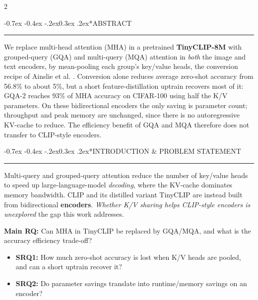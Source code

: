 \documentclass[a0,portrait]{a0poster}
\makeatletter
\renewcommand\section{\@startsection{section}{1}{\z@}%
  {-0.7ex \@plus -0.4ex \@minus -.2ex}{0.3ex \@plus .2ex}{\normalfont\large\bfseries}}
\makeatother
\begin{document}
\begin{multicols}{2}
\sloppy


\color{Black}
\section*{\Large{ABSTRACT}}
\vspace{-1cm}
\noindent\rule{\linewidth}{1pt}

We replace multi-head attention (MHA) in a pretrained \textbf{TinyCLIP-8M} with grouped-query (GQA) and multi-query (MQA) attention in \emph{both} the image and text encoders, by mean-pooling each group's key/value heads, the conversion recipe of Ainslie et al. \cite{gqa2023}. Conversion alone reduces average zero-shot accuracy from 56.8\% to about 5\%, but a short feature-distillation uptrain recovers most of it: GQA-2 reaches 93\% of MHA accuracy on CIFAR-100 using half the K/V parameters. On these bidirectional encoders the only saving is parameter count; throughput and peak memory are unchanged, since there is no autoregressive KV-cache to reduce. The efficiency benefit of GQA and MQA therefore does not transfer to CLIP-style encoders.


\color{Black}
\section*{\Large INTRODUCTION \& PROBLEM STATEMENT}
\vspace{-1cm}
\noindent\rule{\linewidth}{1pt}

Multi-query \cite{mqa2019} and grouped-query \cite{gqa2023} attention reduce the number of key/value heads to speed up large-language-model \emph{decoding}, where the KV-cache dominates memory bandwidth. CLIP \cite{clip2021} and its distilled variant TinyCLIP \cite{tinyclip2023} are instead built from bidirectional \textbf{encoders}. \emph{Whether K/V sharing helps CLIP-style encoders is unexplored} the gap this work addresses.

\vspace{0.5cm}
\noindent\textbf{Main RQ:} Can MHA in TinyCLIP be replaced by GQA/MQA, and what is the accuracy efficiency trade-off?
\vspace{0.4cm}
\begin{itemize}\setlength\itemsep{0pt}\setlength\topsep{0pt}\setlength\parsep{0pt}\setlength\partopsep{0pt}
    \item \textbf{SRQ1:} How much zero-shot accuracy is lost when K/V heads are pooled, and can a short uptrain recover it?
    \item \textbf{SRQ2:} Do parameter savings translate into runtime/memory savings on an encoder?
\end{itemize}


\end{multicols}
\end{document}
